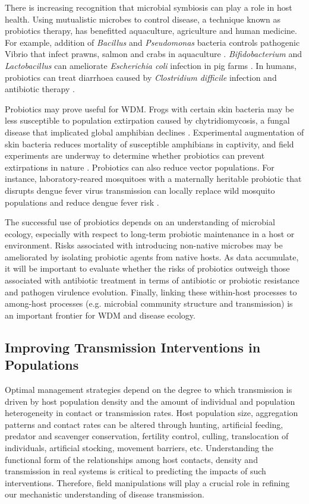 There is increasing recognition that microbial symbiosis can play a role in host health.
Using mutualistic microbes to control disease, a technique known as probiotics therapy, has benefitted aquaculture, agriculture and human medicine.
For example, addition of \textit{Bacillus} and \textit{Pseudomonas} bacteria controls pathogenic Vibrio that infect prawns, salmon and crabs in aquaculture \citep{irianto2002probiotics, panigrahi2007microbial}.
\textit{Bifidobacterium} and \textit{Lactobacillus} can ameliorate \textit{Escherichia coli} infection in pig farms \citep{zani1998effect, shu2001probiotic}.
In humans, probiotics can treat diarrhoea caused by \textit{Clostridium difficile} infection and antibiotic therapy \citep{mcfarland2006meta, rohde2009use}.

Probiotics may prove useful for WDM.
Frogs with certain skin bacteria may be less susceptible to population extirpation caused by chytridiomycosis, a fungal disease that implicated global amphibian declines \citep{Lam2010}.
Experimental augmentation of skin bacteria reduces mortality of susceptible amphibians in captivity, and field experiments are underway to determine whether probiotics can prevent extirpations in nature \citep{Harris2009}.
Probiotics can also reduce vector populations.
For instance, laboratory-reared mosquitoes with a maternally heritable probiotic that disrupts dengue fever virus transmission can locally replace wild mosquito populations and reduce dengue fever risk \citep{hoffmann2011successful}.

The successful use of probiotics depends on an understanding of microbial ecology, especially with respect to long-term probiotic maintenance in a host or environment.
Risks associated with introducing non-native microbes may be ameliorated by isolating probiotic agents from native hosts.
As data accumulate, it will be important to evaluate whether the risks of probiotics outweigh those associated with antibiotic treatment in terms of antibiotic or probiotic resistance and pathogen virulence evolution.
Finally, linking these within-host processes to among-host processes (e.g. microbial community structure and transmission) is an important frontier for WDM and disease ecology.

\subsection{Improving Transmission Interventions in Populations}

Optimal management strategies depend on the degree to which transmission is driven by host population density and the amount of individual and population heterogeneity in contact or transmission rates.
Host population size, aggregation patterns and contact rates can be altered through hunting, artificial feeding, predator and scavenger conservation, fertility control, culling, translocation of individuals, artificial stocking, movement barriers, etc.
Understanding the functional form of the relationships among host contacts, density and transmission in real systems is critical to predicting the impacts of such interventions.
Therefore, field manipulations will play a crucial role in refining our mechanistic understanding of disease transmission.


